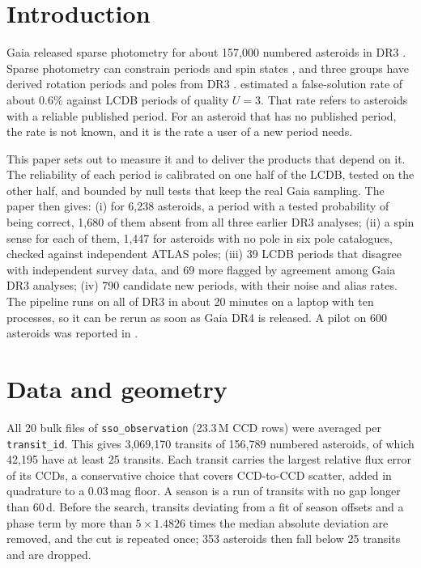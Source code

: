 \section{Introduction}

Gaia \citep{Prusti2016} released sparse photometry for about 157{,}000 numbered asteroids in DR3
\citep{Vallenari2023,Tanga2023}. Sparse photometry can constrain periods and spin states
\citep{Kaasalainen2004}, and three groups have derived rotation periods and poles from DR3
\citep{Durech2023,Cellino2024,MacLennan2026}. \citet{Durech2023} estimated a false-solution rate of about
0.6\% against LCDB periods of quality $U=3$. That rate refers to asteroids with a reliable published period.
For an asteroid that has no published period, the rate is not known, and it is the rate a user of a new
period needs.

This paper sets out to measure it and to deliver the products that depend on it. The reliability of each
period is calibrated on one half of the LCDB, tested on the other half, and bounded by null tests that keep
the real Gaia sampling. The paper then gives:
(i) for 6{,}238 asteroids, a period with a tested probability of being correct, 1{,}680 of them absent from
all three earlier DR3 analyses;
(ii) a spin sense for each of them, 1{,}447 for asteroids with no pole in six pole catalogues, checked
against independent ATLAS poles;
(iii) 39 LCDB periods that disagree with independent survey data, and 69 more flagged by agreement among
Gaia DR3 analyses;
(iv) 790 candidate new periods, with their noise and alias rates.
The pipeline runs on all of DR3 in about 20 minutes on a laptop with ten processes, so it can be rerun as
soon as Gaia DR4 is released. A pilot on 600 asteroids was reported in \citet{Tropynin2026a}.

\section{Data and geometry}

All 20 bulk files of \texttt{sso\_observation} (23.3\,M CCD rows) were averaged per \texttt{transit\_id}.
This gives 3{,}069{,}170 transits of 156{,}789 numbered asteroids, of which 42{,}195 have at least 25
transits. Each transit carries the largest relative flux error of its CCDs, a conservative choice that
covers CCD-to-CCD scatter, added in quadrature to a 0.03\,mag floor. A season is a run of transits with no
gap longer than 60\,d. Before the search, transits deviating from a fit of season offsets and a phase term
by more than $5\times1.4826$ times the median absolute deviation are removed, and the cut is repeated once;
353 asteroids then fall below 25 transits and are dropped.

